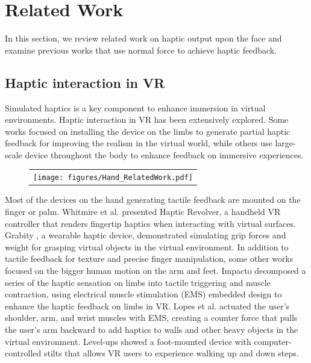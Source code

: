 \chapter{Related Work} \label{chapter:related_work}
In this section, we review related work on haptic output upon the face and examine previous works that use normal force to achieve haptic feedback.

\section{Haptic interaction in VR}
Simulated haptics is a key component to enhance immersion in virtual environments. Haptic interaction in VR has been extensively explored. Some works focused on installing the device on the limbs to generate partial haptic feedback for improving the realism in the virtual world, while others use large-scale device throughout the body to enhance feedback on immersive experiences.

\begin{figure}[h]
    \begin{center}
        \begin{tabular}{@{\hspace{0.1cm}}c}
           \texttt{[image: figures/Hand\_RelatedWork.pdf]}
        \end{tabular}
        \label{fig:Hand_RelatedWork}
    \end{center}
\end{figure}

Most of the devices on the hand generating tactile feedback are mounted on the finger or palm. Whitmire et al. \cite{hapticrevolver} presented Haptic Revolver, a handheld VR controller that renders fingertip haptics when interacting with virtual surfaces. Grabity \cite{Grabity}, a wearable haptic device, demonstrated simulating grip forces and weight for grasping virtual objects in the virtual environment. In addition to tactile feedback for texture and precise finger manipulation, some other works focused on the bigger human motion on the arm and feet. Impacto \cite{Impacto} decomposed a series of the haptic sensation on limbs into tactile triggering and muscle contraction, using electrical muscle stimulation (EMS) embedded design to enhance the haptic feedback on limbs in VR. Lopes et al. \cite{VRwalls} actuated the user's shoulder, arm, and wrist muscles with EMS, creating a counter force that pulls the user's arm backward to add haptics to walls and other heavy objects in the virtual environment. Level-ups \cite{Level-up} showed a foot-mounted device with computer-controlled stilts that allows VR users to experience walking up and down steps.


